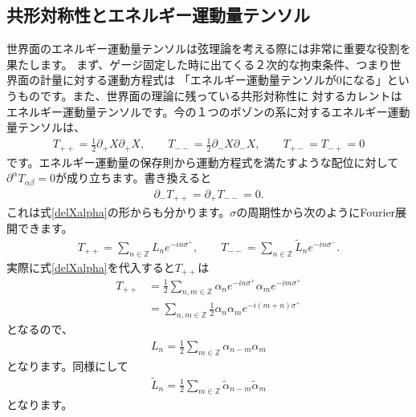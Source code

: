 \documentclass[report,paper=a4, fontsize=12pt, line_length=16cm, number_of_lines=33,dvipdfmx]{jlreq}
\numberwithin{equation}{chapter}
\numberwithin{equation}{section}
\newcommand{\Zb}{\mathbb{Z}}
\newcommand{\del}{\partial}
\newcommand{\alphat}{\tilde{\alpha}}
\newcommand{\Lt}{\widetilde{L}}
\begin{document}
\subsection{共形対称性とエネルギー運動量テンソル}
世界面のエネルギー運動量テンソルは弦理論を考える際には非常に重要な役割を果たします。
まず、ゲージ固定した時に出てくる２次的な拘束条件、つまり世界面の計量に対する運動方程式は
「エネルギー運動量テンソルが$0$になる」というものです。また、世界面の理論に残っている共形対称性に
対するカレントはエネルギー運動量テンソルです。今の１つのボゾンの系に対するエネルギー運動量テンソルは、
\begin{align}
T_{++}=\frac12 \del_{+}X\del_{+}X,\qquad
T_{--}=\frac12 \del_{-}X\del_{-}X,\qquad
T_{+-}=T_{-+}=0\label{free-scalar-EM}
\end{align}
です。エネルギー運動量の保存則から運動方程式を満たすような配位に対して$\del^{\alpha}T_{\alpha\beta}=0$が成り立ちます。書き換えると
\begin{align}
\del_{-}T_{++}=\del_{+}T_{--}=0.
\end{align}
これは式\eqref{delXalpha}の形からも分かります。$\sigma$の周期性から次のようにFourier展開できます。
\begin{align}
T_{++}=\sum_{n\in\Zb}L_{n}e^{-in\sigma^{+}},\qquad
T_{--}=\sum_{n\in\Zb}\Lt_{n}e^{-in\sigma^{-}}.
\end{align}
実際に式\eqref{delXalpha}を代入すると$T_{++}$は
\begin{align}
T_{++}&=\frac12 \sum_{n,m\in\Zb}\alpha_n e^{-in\sigma^{+}}\alpha_m e^{-im\sigma^{+}}\\
&=\sum_{n,m\in\Zb}\frac12 \alpha_n\alpha_m e^{-i(m+n)\sigma^{+}}
\end{align}
となるので、
\begin{align}
L_{n}=\frac12 \sum_{m\in\Zb} \alpha_{n-m}\alpha_{m}
\end{align}
となります。同様にして
\begin{align}
\Lt_{n}=\frac12 \sum_{m\in\Zb} \alphat_{n-m}\alphat_{m}
\end{align}
となります。
\end{document}
